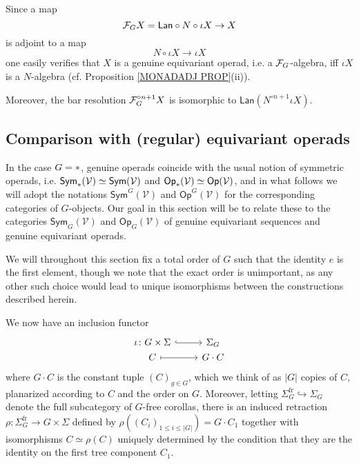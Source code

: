 \documentclass[a4paper,10pt]{article}%
\begin{document}
\begin{remark}\label{REPACKAGERES REM}
Since a map 
\[\mathcal F_G X =\mathsf{Lan} \circ N \circ \iota X \to X\]
is adjoint to a map
\[N \circ \iota X \to \iota X \]
one easily verifies that 
$X$ is a genuine equivariant operad, i.e. 
a $\mathcal F_G$-algebra, iff 
$\iota X$ is a $N$-algebra
(cf. Proposition \ref{MONADADJ PROP}(ii)).

Moreover, the bar resolution
$ \mathcal F_G^{\circ n +1} X $
is isomorphic to
$
	\mathsf{Lan} \left( N^{\circ n +1} \iota X \right)
$.
\end{remark}

\subsection{Comparison with (regular) equivariant operads}
\label{COMPARISON_REGULAR_SECTION}

In the case $G = \**$, genuine operads coincide with the usual notion of symmetric operads, i.e. 
$\mathsf{Sym}_{\**}(\mathcal{V})
\simeq \mathsf{Sym}(\mathcal{V})$
and
$\mathsf{Op}_{\**}(\mathcal{V})
\simeq \mathsf{Op}(\mathcal{V})$, 
and in what follows we will adopt the notations
$\mathsf{Sym}^G(\mathcal{V})$ and
$\mathsf{Op}^G(\mathcal{V})$ 
for the corresponding categories of $G$-objects.
Our goal in this section will be to relate these to the categories
$\mathsf{Sym}_G(\mathcal{V})$ and $\mathsf{Op}_G(\mathcal{V})$
of genuine equivariant sequences and genuine equivariant operads.

We will throughout this section fix a total order of $G$ such that the identity $e$ is the first element, though we note that the exact order is unimportant, as any other such choice would lead to unique isomorphisms between the constructions described herein.

We now have an inclusion functor
\[
\begin{tikzcd}[row sep =0]
	\iota \colon G \times \Sigma \ar[hookrightarrow]{r} &
	\Sigma_G
\\
	C \ar[mapsto]{r} & G \cdot C
\end{tikzcd}
\]
where $G \cdot C$ is the constant tuple $(C)_{g \in G}$,
which we think of as $|G|$ copies of $C$, planarized according to $C$ and the order on $G$.
Moreover, letting $\Sigma_G^{\text{fr}} \hookrightarrow \Sigma_G$ denote the full subcategory of $G$-free corollas, there is an induced retraction 
$\rho \colon \Sigma_{G}^{\text{fr}} \to G \times \Sigma$
defined by 
$\rho\left( (C_i)_{1\leq i \leq |G|} \right) = G \cdot C_1$
together with isomorphisms 
$C \simeq \rho(C)$
uniquely determined by the condition that they
are the identity on the first tree component $C_1$.
\end{document}
